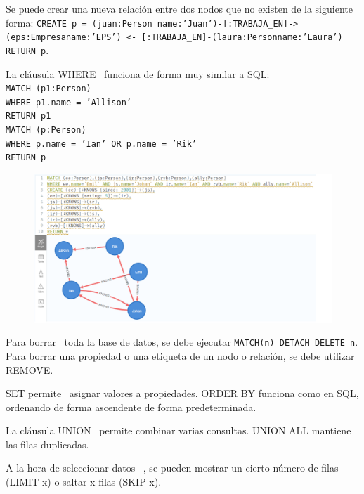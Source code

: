 Se puede crear una nueva relación entre dos nodos que no existen de la siguiente forma: \texttt{CREATE p = (juan:Person {name:'Juan'})-[:TRABAJA\_EN]->(eps:Empresa{name:'EPS'}) <- [:TRABAJA\_EN]-(laura:Person{name:'Laura'}) RETURN p}.

La cláusula WHERE   \ funciona de forma muy similar a SQL: \\
\texttt{MATCH (p1:Person) \\ WHERE p1.name = 'Allison' \\ RETURN p1} \\
\texttt{MATCH (p:Person) \\ WHERE p.name = 'Ian' OR p.name = 'Rik' \\ RETURN p}

\begin{figure}[htbp]
\centering
\includegraphics[width = \textwidth]{figs/where-cql.png}
\end{figure}

Para borrar   \ toda la base de datos, se debe ejecutar \texttt{MATCH(n) DETACH DELETE n}. Para borrar una propiedad o una etiqueta de un nodo o relación, se debe utilizar REMOVE. 

SET permite   \ asignar valores a propiedades. ORDER BY funciona como en SQL, ordenando de forma ascendente de forma predeterminada.

La cláusula UNION   \ permite combinar varias consultas. UNION ALL mantiene las filas duplicadas. 

A la hora de seleccionar datos   \ , se pueden mostrar un cierto número de filas (LIMIT x) o saltar x filas (SKIP x). 

